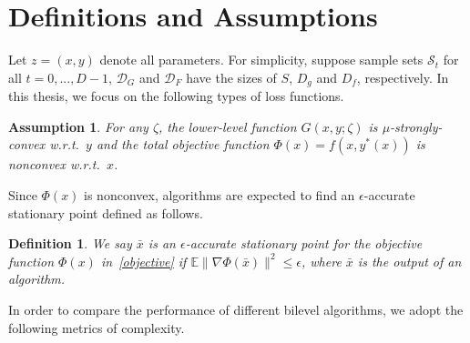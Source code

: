 \documentclass{osudissert96}
\def\gD{{\mathcal{D}}}
\def\gS{{\mathcal{S}}}
\newtheorem{assum}{Assumption}
\newtheorem{definition}{Definition}
\begin{document}
\section{Definitions and Assumptions}
Let $z=(x,y)$ denote all parameters. For simplicity, suppose sample sets $\gS_t$  for all $t=0,...,D-1$, $\gD_G$ and $\gD_F$ have the sizes of  $S$, $D_g$ and $D_f$, respectively.  In this thesis, we focus on the following types of loss functions.
\begin{assum}\label{assum:stoc_geo}
For any $\zeta$, the lower-level function $G(x,y;\zeta)$ is $\mu$-strongly-convex w.r.t.~$y$ and the total objective function $\Phi(x)=f(x,y^*(x))$ is nonconvex w.r.t.~$x$.  %
\vspace{-0.2cm} 
\end{assum}
Since $\Phi(x)$ is nonconvex, algorithms are expected to find an $\epsilon$-accurate stationary point defined as follows. 
\begin{definition}
We say $\bar x$ is an $\epsilon$-accurate stationary point for the objective function $\Phi(x)$ in~\cref{objective} if $\mathbb{E}\|\nabla \Phi(\bar x)\|^2\leq \epsilon$, where $\bar x$ is the output of  an algorithm.
\end{definition}
In order to compare the performance of different bilevel algorithms, we adopt the following metrics of  complexity. 
\end{document}
